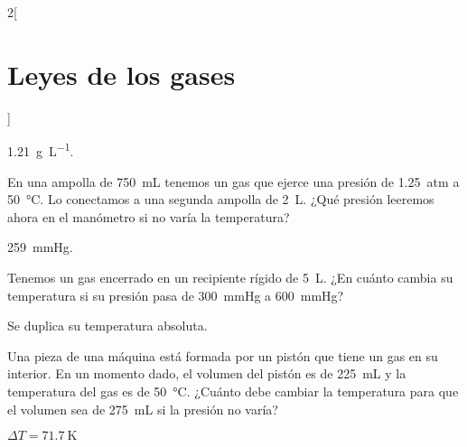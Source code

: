\documentclass[10pt]{article}
\begin{document}
\begin{multicols}{2}[
  \section{Leyes de los gases}
  ]
  \begin{solution}
    \SI{1.21}{\gram\per\liter}.
  \end{solution}




  \begin{exercise}[
      tags    = {termodinámica, entalpía, entalpia de reacción, calor},
      topics  = {química, termoquímica, termodinámica},
      source  = {FQ 1B SAN 2015, p66, e37},
    ]
    En una ampolla de \SI{750}{\milli\liter} tenemos un gas que ejerce una presión de \SI{1.25}{atm} a \SI{50}{\celsius}. Lo conectamos a una segunda ampolla de \SI{2}{\liter}. ¿Qué presión leeremos ahora en el manómetro si no varía la temperatura?
  \end{exercise}

  \begin{solution}
    \SI{259}{\mmHg}.
  \end{solution}



  \begin{exercise}[
      tags    = {termodinámica, entalpía, entalpia de reacción, calor},
      topics  = {química, termoquímica, termodinámica},
      source  = {FQ 1B SAN 2015, p66, e39},
    ]
    Tenemos un gas encerrado en un recipiente rígido de \SI{5}{\liter}. ¿En cuánto cambia su temperatura si su presión pasa de \SI{300}{\mmHg} a \SI{600}{\mmHg}?
  \end{exercise}

  \begin{solution}
    Se duplica su temperatura absoluta.
  \end{solution}




  \begin{exercise}[
      tags    = {termodinámica, entalpía, entalpia de reacción, calor},
      topics  = {química, termoquímica, termodinámica},
      source  = {FQ 1B SAN 2015, p66, e39},
    ]
    Una pieza de una máquina está formada por un pistón que tiene un gas en su interior. En un momento dado, el volumen del pistón es de \SI{225}{\milli\liter} y la temperatura del gas es de \SI{50}{\celsius}. ¿Cuánto debe cambiar la temperatura para que el volumen sea de \SI{275}{\milli\liter} si la presión no varía?
  \end{exercise}

  \begin{solution}
    \( \Delta T = \SI{+71.7}{\kelvin} \)
  \end{solution}





\end{multicols}
\end{document}
